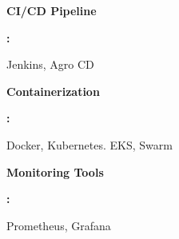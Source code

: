 \documentclass[9pt]{developercv} %
\begin{document}
\begin{minipage}[t]{0.465\textwidth}
    \begin{minipage}[t]{0.3\textwidth}
        \textbf{CI/CD Pipeline}
    \end{minipage}
     \begin{minipage}[t]{0.1\textwidth}
        \textbf{:}
    \end{minipage}
    \hfill
    \begin{minipage}[t]{0.73\textwidth}
      Jenkins, Agro CD
    \end{minipage}

    \begin{minipage}[t]{0.3\textwidth}
        \textbf{Containerization}
    \end{minipage}
    \begin{minipage}[t]{0.1\textwidth}
        \textbf{:}
    \end{minipage}
    \hfill
    \begin{minipage}[t]{0.73\textwidth}
      Docker, Kubernetes. EKS, Swarm
    \end{minipage}

    \begin{minipage}[t]{0.3\textwidth}
        \textbf{Monitoring Tools}
    \end{minipage}
    \begin{minipage}[t]{0.1\textwidth}
        \textbf{:}
    \end{minipage}
    \hfill
    \begin{minipage}[t]{0.73\textwidth}
      Prometheus, Grafana
    \end{minipage}
    
\end{minipage}
\end{document}
